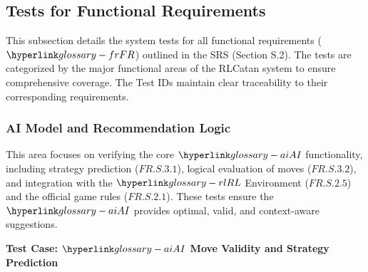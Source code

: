 \documentclass[12pt, titlepage]{article}
\begin{document}
\subsection{Tests for Functional Requirements}

This subsection details the system tests for all functional requirements ($\FR{}$) outlined in the SRS (Section S.2).
The tests are categorized by the major functional areas of the RLCatan system to ensure comprehensive coverage.
The Test IDs maintain clear traceability to their corresponding requirements.

\subsubsection{AI Model and Recommendation Logic}

This area focuses on verifying the core $\AI{}$ functionality, including strategy prediction ($\hyperref[FR.S.3.1]{FR.S.3.1}$), logical evaluation of moves ($\hyperref[FR.S.3.2]{FR.S.3.2}$), and integration with the $\RL{}$ Environment ($\hyperref[FR.S.2.5]{FR.S.2.5}$) and the official game rules ($\hyperref[FR.S.2.1]{FR.S.2.1}$). These tests ensure the $\AI{}$ provides optimal, valid, and context-aware suggestions.

\textbf{Test Case: $\AI{}$ Move Validity and Strategy Prediction}
\end{document}
